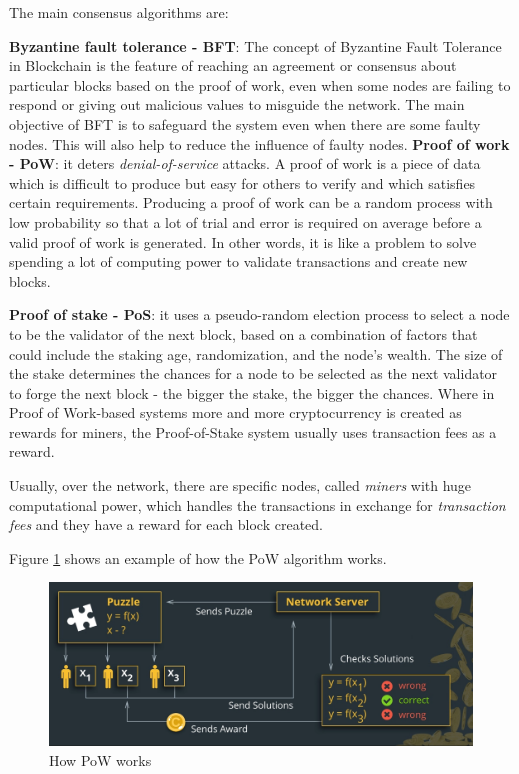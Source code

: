 The main consensus algorithms are:
\begin{outline}
    \1 \textbf{Byzantine fault tolerance - BFT}: The concept of Byzantine Fault Tolerance in Blockchain is the 
    feature of reaching an agreement or consensus about particular blocks based on the proof of work, even when some 
    nodes are failing to respond or giving out malicious values to misguide the network. The main objective of BFT is 
    to safeguard the system even when there are some faulty nodes. This will also help to reduce the influence of faulty 
    nodes.\cite{bft}
    \2 \textbf{Proof of work - PoW}: it deters \textit{denial-of-service} attacks. A proof of work is a piece of data 
    which is difficult to produce but easy for others to verify and which satisfies certain requirements. Producing a 
    proof of work can be a random process with low probability so that a lot of trial and error is required on average 
    before a valid proof of work is generated. In other words, it is like a problem to solve spending a lot of computing 
    power to validate transactions and create new blocks.\cite{pow}
    
    

    \1 \textbf{Proof of stake - PoS}: it uses a pseudo-random election process to select a node to be the validator of 
    the next block, based on a combination of factors that could include the staking age, randomization, and the node’s 
    wealth. The size of the stake determines the chances for a node to be selected as the next validator to forge the 
    next block - the bigger the stake, the bigger the chances. Where in Proof of Work-based systems more and more 
    cryptocurrency is created as rewards for miners, the Proof-of-Stake system usually uses transaction fees as a 
    reward.\cite{pos}
\end{outline}

Usually, over the network, there are specific nodes, called \textit{miners} with huge computational power, which handles
the transactions in exchange for \textit{transaction fees} and they have a reward for each block created. 

Figure \ref{fig:pow-work} shows an example of how the PoW algorithm works. 
\begin{figure}[h!]
    \centering
    \includegraphics[totalheight=5cm]{img/puzzle.PNG}
    \caption{How PoW works}
    \label{fig:pow-work}
\end{figure}

